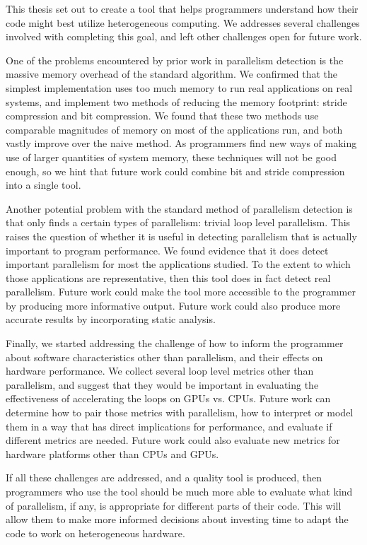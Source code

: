 \documentclass[12pt,twoside]{reedthesis}
\begin{document}
	This thesis set out to create a tool that helps programmers understand how their code might best utilize heterogeneous computing. We addresses several challenges involved with completing this goal, and left other challenges open for future work. %
	
	One of the problems encountered by prior work in parallelism detection is the massive memory overhead of the standard algorithm.
	We confirmed that the simplest implementation uses too much memory to run real applications on real systems, and implement two methods of reducing the memory footprint: stride compression and bit compression. We found that these two methods use comparable magnitudes of memory on most of the applications run, and both vastly improve over the naive method. As programmers find new ways of making use of larger quantities of system memory, these techniques will not be good enough, so we hint that future work could combine bit and stride compression into a single tool. 
	
	Another potential problem with the standard method of parallelism detection is that only finds a certain types of parallelism: trivial loop level parallelism. This raises the question of whether it is useful in detecting parallelism that is actually important to program performance. We found evidence that it does detect important parallelism for most the applications studied. To the extent to which those applications are representative, then this tool does in fact detect real parallelism. 
	Future work could make the tool more accessible to the programmer by producing more informative output. Future work could also produce more accurate results by incorporating static analysis. 
	
	Finally, we started addressing the challenge of how to inform the programmer about software characteristics other than parallelism, and their effects on hardware performance. We collect several loop level metrics other than parallelism, and suggest that they would be important in evaluating the effectiveness of accelerating the loops on GPUs vs. CPUs. 
	Future work can determine how to pair those metrics with parallelism, how to interpret or model them in a way that has direct implications for performance, and evaluate if different metrics are needed. Future work could also evaluate new metrics for hardware platforms other than CPUs and GPUs.
	
	If all these challenges are addressed, and a quality tool is produced, then programmers who use the tool should be much more able to evaluate what kind of parallelism, if any, is appropriate for different parts of their code. This will allow them to make more informed decisions about investing time to adapt the code to work on heterogeneous hardware. %
	
\end{document}
